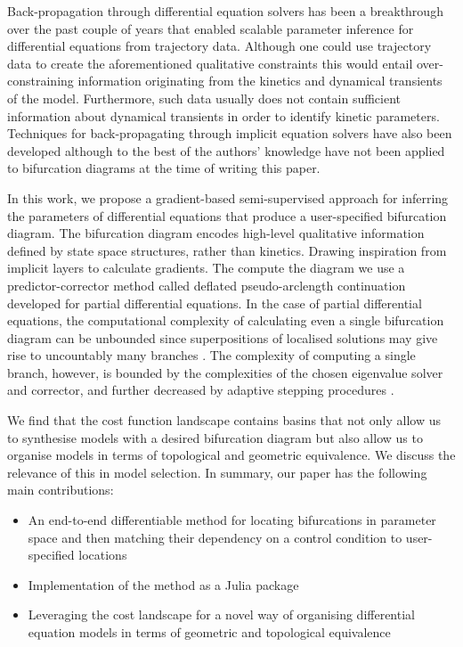 Back-propagation through differential equation solvers has been a breakthrough over the past couple of years \cite{Chen2018NeuralEquations,Rackauckas2019DiffEqFlux.jl-AEquations} that enabled scalable parameter inference for differential equations from trajectory data. Although one could use trajectory data to create the aforementioned qualitative constraints \cite{Ranciati2017BayesianParameters,Khadivar2021LearningBifurcations} this would entail over-constraining information originating from the kinetics and dynamical transients of the model. Furthermore, such data usually does not contain sufficient information about dynamical transients in order to identify kinetic parameters. Techniques for back-propagating through implicit equation solvers have also been developed \cite{Look2020DifferentiableLayers,Bai2019DeepModels} although to the best of the authors' knowledge have not been applied to bifurcation diagrams at the time of writing this paper.

In this work, we propose a gradient-based semi-supervised approach for inferring the parameters of differential equations that produce a user-specified bifurcation diagram. The bifurcation diagram encodes high-level qualitative information defined by state space structures, rather than kinetics. Drawing inspiration from implicit layers \cite{Look2020DifferentiableLayers,Bai2019DeepModels} to calculate gradients. The compute the diagram we use a predictor-corrector method called deflated pseudo-arclength continuation \cite{Farrell2016TheDiagrams,Veltz2019PseudoArcLengthContinuation.jl} developed for partial differential equations. In the case of partial differential equations, the computational complexity of calculating even a single bifurcation diagram can be unbounded since superpositions of localised solutions may give rise to uncountably many branches \cite{Avitabile2010ToEquation}. The complexity of computing a single branch, however, is bounded by the complexities of the chosen eigenvalue solver and corrector, and further decreased by adaptive stepping procedures \cite{Aruliah2016AlgorithmContinuation}.

We find that the cost function landscape contains basins that not only allow us to synthesise models with a desired bifurcation diagram but also allow us to organise models in terms of topological and geometric equivalence. We discuss the relevance of this in model selection. In summary, our paper has the following main contributions:

\begin{itemize}
    \item An end-to-end differentiable method for locating bifurcations in parameter space and then matching their dependency on a control condition to user-specified locations
    \item Implementation of the method as a Julia package \cite{Szep2021BifurcationFit.jlDiagrams}
    \item Leveraging the cost landscape for a novel way of organising differential equation models in terms of geometric and topological equivalence
\end{itemize}

